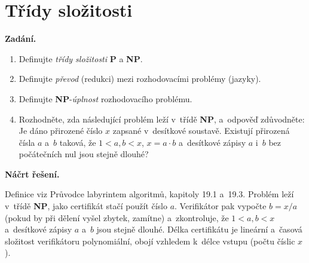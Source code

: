 \section{Třídy složitosti}

\noindent\textbf{Zadání.}\par
\begin{enumerate}
\item Definujte \textit{třídy složitosti} \textbf{P} a \textbf{NP}.
\item Definujte \textit{převod} (redukci) mezi rozhodovacími problémy (jazyky).
\item Definujte \textbf{NP}-\textit{úplnost} rozhodovacího problému.
\item Rozhodněte, zda následující problém leží v~třídě \textbf{NP}, a~odpověď zdůvodněte:
  Je dáno přirozené číslo $x$ zapsané v~desítkové soustavě. Existují přirozená čísla $a$
  a~$b$ taková, že $1 < a, b < x$, $x = a \cdot b$ a~desítkové zápisy $a$ i~$b$ bez
  počátečních nul jsou stejně dlouhé?
\end{enumerate}

\medskip
\noindent\textbf{Náčrt řešení.}\par
Definice viz Průvodce labyrintem algoritmů, kapitoly 19.1 a~19.3. Problém leží v~třídě
\textbf{NP}, jako certifikát stačí použít číslo $a$. Verifikátor pak vypočte $b = x/a$
(pokud by při dělení vyšel zbytek, zamítne) a~zkontroluje, že $1 < a, b < x$ a~desítkové
zápisy $a$ a~$b$ jsou stejně dlouhé. Délka certifikátu je lineární a~časová složitost
verifikátoru polynomiální, obojí vzhledem k~délce vstupu (počtu číslic $x$).

